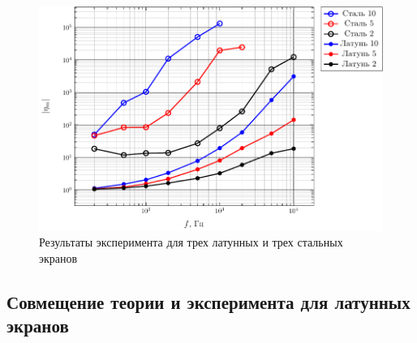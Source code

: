 \begin{figure}[H]
	\centering
	\includegraphics[scale=1]{imgs/graphs/eta}
	\caption{Результаты эксперимента для трех латунных и трех стальных экранов}
	\label{fig:all}
\end{figure}

\subsection{Совмещение теории и эксперимента для латунных экранов}

